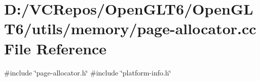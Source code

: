\hypertarget{page-allocator_8cc}{}\section{D\+:/\+V\+C\+Repos/\+Open\+G\+L\+T6/\+Open\+G\+L\+T6/utils/memory/page-\/allocator.cc File Reference}
\label{page-allocator_8cc}
{\ttfamily \#include \char`\"{}page-\/allocator.\+h\char`\"{}}\newline
{\ttfamily \#include \char`\"{}platform-\/info.\+h\char`\"{}}\newline
